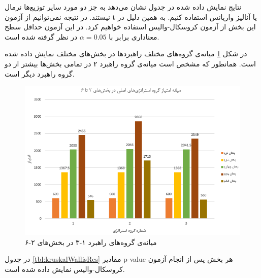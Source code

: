 \documentclass[twoside, a4paper,11pt]{book}
\numberwithin{equation}{chapter}
\numberwithin{table}{chapter}
\numberwithin{figure}{chapter}
\numberwithin{equation}{chapter}
\begin{document}
نتایج نمایش داده شده در جدول نشان می‌دهد به جز دو مورد سایر توزیع‌ها نرمال نیستند. در نتیجه نمی‌توانیم از آزمون t  یا آنالیز واریانس استفاده کنیم. به همین دلیل در این بخش از آزمون کروسکال-والیس استفاده خواهیم کرد. در این آزمون حداقل سطح معناداری برابر با $\alpha = 0.05$ در نظر گرفته شده است.

در شکل \ref{fig:part2-6MedianOfScores} میانه‌ی گروه‌های مختلف راهبردها در بخش‌های مختلف نمایش داده شده است. همانطور که مشخص است میانه‌ی گروه راهبرد ۲ در تمامی بخش‌ها بیشتر از دو گروه راهبرد دیگر است.
\begin{figure}
\includegraphics[width=1\textwidth, center]{Figures/part2-6MedianOfScores.png}
\caption{\label{fig:part2-6MedianOfScores}
میانه‌ی گروه‌های راهبرد ۱-۳ در بخش‌های ۲-۶
}
\end{figure}

در جدول \ref{tbl:kruskalWallisRes} مقادیر p-value هر بخش پس از انجام آزمون کروسکال-والیس نمایش داده شده است.
\end{document}
